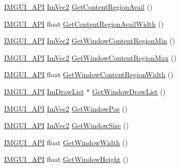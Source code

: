 \begin{DoxyCompactItemize}
\item 
\mbox{\hyperlink{imgui_8h_a43829975e84e45d1149597467a14bbf5}{I\+M\+G\+U\+I\+\_\+\+A\+PI}} \mbox{\hyperlink{struct_im_vec2}{Im\+Vec2}} \mbox{\hyperlink{namespace_im_gui_a410c8e19b2fea8b52746ca11b3930301}{Get\+Content\+Region\+Avail}} ()
\item 
\mbox{\hyperlink{imgui_8h_a43829975e84e45d1149597467a14bbf5}{I\+M\+G\+U\+I\+\_\+\+A\+PI}} float \mbox{\hyperlink{namespace_im_gui_a52e3311f46626a5d0369139d20da993a}{Get\+Content\+Region\+Avail\+Width}} ()
\item 
\mbox{\hyperlink{imgui_8h_a43829975e84e45d1149597467a14bbf5}{I\+M\+G\+U\+I\+\_\+\+A\+PI}} \mbox{\hyperlink{struct_im_vec2}{Im\+Vec2}} \mbox{\hyperlink{namespace_im_gui_a790123aa15c266798f35050ba36b7197}{Get\+Window\+Content\+Region\+Min}} ()
\item 
\mbox{\hyperlink{imgui_8h_a43829975e84e45d1149597467a14bbf5}{I\+M\+G\+U\+I\+\_\+\+A\+PI}} \mbox{\hyperlink{struct_im_vec2}{Im\+Vec2}} \mbox{\hyperlink{namespace_im_gui_a96ce6060592d3ef975594357e650adc6}{Get\+Window\+Content\+Region\+Max}} ()
\item 
\mbox{\hyperlink{imgui_8h_a43829975e84e45d1149597467a14bbf5}{I\+M\+G\+U\+I\+\_\+\+A\+PI}} float \mbox{\hyperlink{namespace_im_gui_a87c1de99e670bff87c43bfb07bbf898f}{Get\+Window\+Content\+Region\+Width}} ()
\item 
\mbox{\hyperlink{imgui_8h_a43829975e84e45d1149597467a14bbf5}{I\+M\+G\+U\+I\+\_\+\+A\+PI}} \mbox{\hyperlink{struct_im_draw_list}{Im\+Draw\+List}} $\ast$ \mbox{\hyperlink{namespace_im_gui_aa100c22a9feafe843fa12c66590cbda0}{Get\+Window\+Draw\+List}} ()
\item 
\mbox{\hyperlink{imgui_8h_a43829975e84e45d1149597467a14bbf5}{I\+M\+G\+U\+I\+\_\+\+A\+PI}} \mbox{\hyperlink{struct_im_vec2}{Im\+Vec2}} \mbox{\hyperlink{namespace_im_gui_a413d939f3ef416a47d6e5b48be955146}{Get\+Window\+Pos}} ()
\item 
\mbox{\hyperlink{imgui_8h_a43829975e84e45d1149597467a14bbf5}{I\+M\+G\+U\+I\+\_\+\+A\+PI}} \mbox{\hyperlink{struct_im_vec2}{Im\+Vec2}} \mbox{\hyperlink{namespace_im_gui_aaa5c0bfac7125ba9850a08b6db2e90c9}{Get\+Window\+Size}} ()
\item 
\mbox{\hyperlink{imgui_8h_a43829975e84e45d1149597467a14bbf5}{I\+M\+G\+U\+I\+\_\+\+A\+PI}} float \mbox{\hyperlink{namespace_im_gui_a471ff23945b99541c506dbdc2a9004cf}{Get\+Window\+Width}} ()
\item 
\mbox{\hyperlink{imgui_8h_a43829975e84e45d1149597467a14bbf5}{I\+M\+G\+U\+I\+\_\+\+A\+PI}} float \mbox{\hyperlink{namespace_im_gui_a44d2bfb80e0d2dd232a553ab29a91b52}{Get\+Window\+Height}} ()

\end{DoxyCompactItemize}
